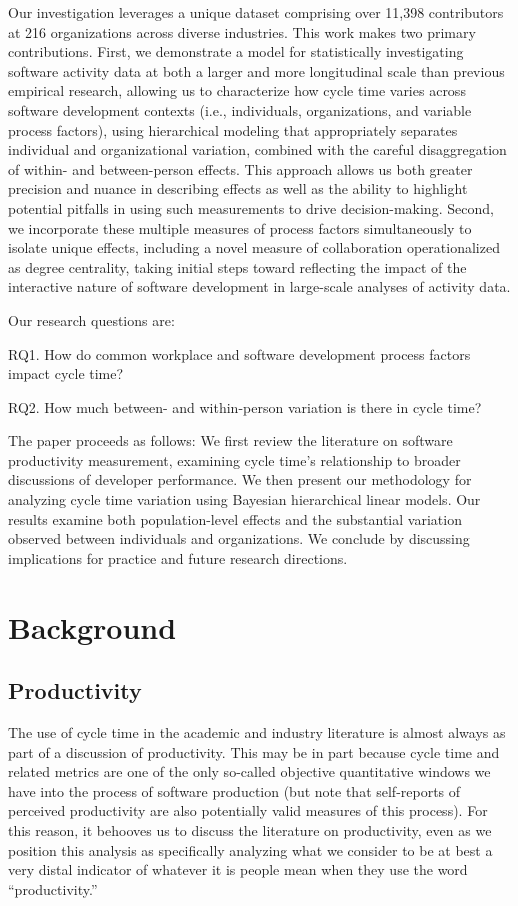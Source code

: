\documentclass[
  sn-mathphys-ay,
]{sn-jnl}
\begin{document}
Our investigation leverages a unique dataset comprising over 11,398
contributors at 216 organizations across diverse industries. This work
makes two primary contributions. First, we demonstrate a model for
statistically investigating software activity data at both a larger and
more longitudinal scale than previous empirical research, allowing us to
characterize how cycle time varies across software development contexts
(i.e., individuals, organizations, and variable process factors), using
hierarchical modeling that appropriately separates individual and
organizational variation, combined with the careful disaggregation of
within- and between-person effects. This approach allows us both greater
precision and nuance in describing effects as well as the ability to
highlight potential pitfalls in using such measurements to drive
decision-making. Second, we incorporate these multiple measures of
process factors simultaneously to isolate unique effects, including a
novel measure of collaboration operationalized as degree centrality,
taking initial steps toward reflecting the impact of the interactive
nature of software development in large-scale analyses of activity data.

Our research questions are:

RQ1. How do common workplace and software development process factors
impact cycle time?

RQ2. How much between- and within-person variation is there in cycle
time?

The paper proceeds as follows: We first review the literature on
software productivity measurement, examining cycle time's relationship
to broader discussions of developer performance. We then present our
methodology for analyzing cycle time variation using Bayesian
hierarchical linear models. Our results examine both population-level
effects and the substantial variation observed between individuals and
organizations. We conclude by discussing implications for practice and
future research directions.

\section{Background}\label{background}

\subsection{Productivity}\label{productivity}

The use of cycle time in the academic and industry literature is almost
always as part of a discussion of productivity. This may be in part
because cycle time and related metrics are one of the only so-called
objective quantitative windows we have into the process of software
production (but note that self-reports of perceived productivity are
also potentially valid measures of this process). For this reason, it
behooves us to discuss the literature on productivity, even as we
position this analysis as specifically analyzing what we consider to be
at best a very distal indicator of whatever it is people mean when they
use the word ``productivity.''
\end{document}
